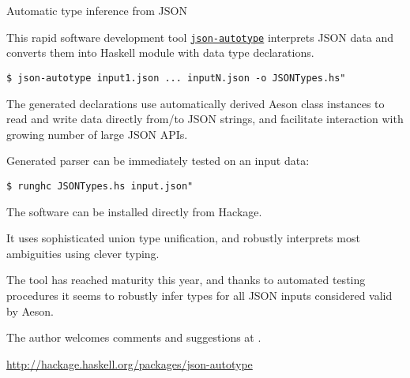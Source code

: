 \begin{hcarentry}[new]{Automatic type inference from JSON}
\label{jsonautotype}
\makeheader

This rapid software development tool \href{https://github.com/mgajda/json-autotype}{\texttt{json-autotype}} interprets JSON
data and converts them into Haskell module with data type declarations.

\begin{verbatim}
$ json-autotype input1.json ... inputN.json -o JSONTypes.hs"
\end{verbatim}

The generated declarations use automatically derived Aeson class instances
to read and write data directly from/to JSON strings,
and facilitate interaction with growing number of large JSON APIs.

Generated parser can be immediately tested on an input data:

\begin{verbatim}
$ runghc JSONTypes.hs input.json"
\end{verbatim}

The software can be installed directly from Hackage.

It uses sophisticated union type unification, and robustly
interprets most ambiguities using clever typing.

The tool has reached maturity this year, and thanks to automated testing procedures it seems to robustly infer types
for all JSON inputs considered valid by Aeson.

The author welcomes comments and suggestions at .

\FurtherReading
\url{http://hackage.haskell.org/packages/json-autotype}
\end{hcarentry}
